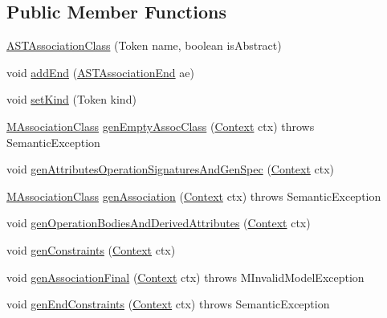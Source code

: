 \subsection*{Public Member Functions}
\begin{DoxyCompactItemize}
\item 
\hyperlink{classorg_1_1tzi_1_1use_1_1parser_1_1use_1_1_a_s_t_association_class_a95fc0d05babc8a6a9c2c81b9e8b0b758}{A\-S\-T\-Association\-Class} (Token name, boolean is\-Abstract)
\item 
void \hyperlink{classorg_1_1tzi_1_1use_1_1parser_1_1use_1_1_a_s_t_association_class_a0f6c021fb55d2438a6bf3a436690e62d}{add\-End} (\hyperlink{classorg_1_1tzi_1_1use_1_1parser_1_1use_1_1_a_s_t_association_end}{A\-S\-T\-Association\-End} ae)
\item 
void \hyperlink{classorg_1_1tzi_1_1use_1_1parser_1_1use_1_1_a_s_t_association_class_a9c77eca89f1a3622cc077cd67036c1a6}{set\-Kind} (Token kind)
\item 
\hyperlink{interfaceorg_1_1tzi_1_1use_1_1uml_1_1mm_1_1_m_association_class}{M\-Association\-Class} \hyperlink{classorg_1_1tzi_1_1use_1_1parser_1_1use_1_1_a_s_t_association_class_a1bb2a3d0cf5bddfaf45eecccf2a9192d}{gen\-Empty\-Assoc\-Class} (\hyperlink{classorg_1_1tzi_1_1use_1_1parser_1_1_context}{Context} ctx)  throws Semantic\-Exception 
\item 
void \hyperlink{classorg_1_1tzi_1_1use_1_1parser_1_1use_1_1_a_s_t_association_class_a4628c52d82d59de06e17410ba3344362}{gen\-Attributes\-Operation\-Signatures\-And\-Gen\-Spec} (\hyperlink{classorg_1_1tzi_1_1use_1_1parser_1_1_context}{Context} ctx)
\item 
\hyperlink{interfaceorg_1_1tzi_1_1use_1_1uml_1_1mm_1_1_m_association_class}{M\-Association\-Class} \hyperlink{classorg_1_1tzi_1_1use_1_1parser_1_1use_1_1_a_s_t_association_class_a6b93eca02e93a623174b79d2bc5167f7}{gen\-Association} (\hyperlink{classorg_1_1tzi_1_1use_1_1parser_1_1_context}{Context} ctx)  throws Semantic\-Exception 
\item 
void \hyperlink{classorg_1_1tzi_1_1use_1_1parser_1_1use_1_1_a_s_t_association_class_a19e5b0d29b7c292e9fd3a550f66e695f}{gen\-Operation\-Bodies\-And\-Derived\-Attributes} (\hyperlink{classorg_1_1tzi_1_1use_1_1parser_1_1_context}{Context} ctx)
\item 
void \hyperlink{classorg_1_1tzi_1_1use_1_1parser_1_1use_1_1_a_s_t_association_class_a6666fbba661c528e882fc1f2ddd2a834}{gen\-Constraints} (\hyperlink{classorg_1_1tzi_1_1use_1_1parser_1_1_context}{Context} ctx)
\item 
void \hyperlink{classorg_1_1tzi_1_1use_1_1parser_1_1use_1_1_a_s_t_association_class_a61f432924130b275e5d5f0f1293ecf2d}{gen\-Association\-Final} (\hyperlink{classorg_1_1tzi_1_1use_1_1parser_1_1_context}{Context} ctx)  throws M\-Invalid\-Model\-Exception 
\item 
void \hyperlink{classorg_1_1tzi_1_1use_1_1parser_1_1use_1_1_a_s_t_association_class_a0393960b0b6fccdb9ed1e2b8d8115d33}{gen\-End\-Constraints} (\hyperlink{classorg_1_1tzi_1_1use_1_1parser_1_1_context}{Context} ctx)  throws Semantic\-Exception 
\end{DoxyCompactItemize}
